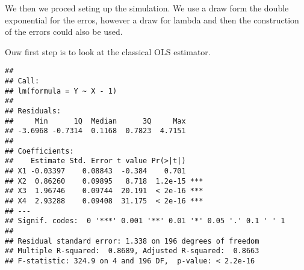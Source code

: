 \documentclass[
]{article}
\newenvironment{Shaded}{\begin{snugshade}}{\end{snugshade}}
\newcommand{\CommentTok}[1]{\textcolor[rgb]{0.56,0.35,0.01}{\textit{#1}}}
\newcommand{\ControlFlowTok}[1]{\textcolor[rgb]{0.13,0.29,0.53}{\textbf{#1}}}
\newcommand{\DataTypeTok}[1]{\textcolor[rgb]{0.13,0.29,0.53}{#1}}
\newcommand{\DecValTok}[1]{\textcolor[rgb]{0.00,0.00,0.81}{#1}}
\newcommand{\KeywordTok}[1]{\textcolor[rgb]{0.13,0.29,0.53}{\textbf{#1}}}
\newcommand{\NormalTok}[1]{#1}
\newcommand{\OperatorTok}[1]{\textcolor[rgb]{0.81,0.36,0.00}{\textbf{#1}}}
\newcommand{\OtherTok}[1]{\textcolor[rgb]{0.56,0.35,0.01}{#1}}
\newcommand{\StringTok}[1]{\textcolor[rgb]{0.31,0.60,0.02}{#1}}
\begin{document}
We then we proced seting up the simulation. We use a draw form the
double exponential for the erros, however a draw for lambda and then the
construction of the errors could also be used.

\begin{Shaded}
\end{Shaded}

Ouw first step is to look at the classical OLS estimator.

\begin{Shaded}
\end{Shaded}

\begin{verbatim}
## 
## Call:
## lm(formula = Y ~ X - 1)
## 
## Residuals:
##     Min      1Q  Median      3Q     Max 
## -3.6968 -0.7314  0.1168  0.7823  4.7151 
## 
## Coefficients:
##    Estimate Std. Error t value Pr(>|t|)    
## X1 -0.03397    0.08843  -0.384    0.701    
## X2  0.86260    0.09895   8.718  1.2e-15 ***
## X3  1.96746    0.09744  20.191  < 2e-16 ***
## X4  2.93288    0.09408  31.175  < 2e-16 ***
## ---
## Signif. codes:  0 '***' 0.001 '**' 0.01 '*' 0.05 '.' 0.1 ' ' 1
## 
## Residual standard error: 1.338 on 196 degrees of freedom
## Multiple R-squared:  0.8689, Adjusted R-squared:  0.8663 
## F-statistic: 324.9 on 4 and 196 DF,  p-value: < 2.2e-16
\end{verbatim}
\end{document}
